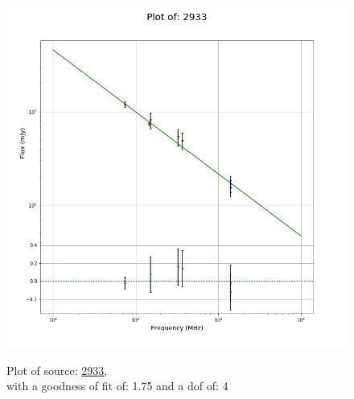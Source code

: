 \documentclass{article}
\begin{document}
\begin{figure}[H]
    \centering
    \begin{minipage}{.5\textwidth}
        \centering
        \includegraphics[scale = 0.35]{KmeulenTrap4P23_1hr/1hr2933.png}
        \captionsetup{labelformat=empty}
        \caption{Plot of source: \href{http://banana.transientskp.org/r4/vlo_KmeulenTrap4P23/runningcatalog/2933}{2933},\\with a goodness of fit of: 1.75 and a dof of: 4}
        \addtocounter{figure}{-1}
        \label{KmeulenTrap4P23:1hr:2933:plot}
    \end{minipage}%
    \begin{minipage}{0.5\textwidth}
        \centering


\end{minipage}
\end{figure}
\end{document}
